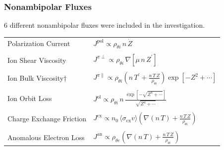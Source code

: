\documentclass[10pt]{beamer}
\begin{document}
\begin{frame} %
\frametitle{Nonambipolar Fluxes}
6 different nonambipolar fluxes were included in the investigation.
\parencite{stringer_explanation_1993} \parencite{itoh_role_1996} \parencite{toda_theoretical_1997} \parencite{staps_backstepping_2017} \\
\begin{center}
\begin{tabular}{l|l} \hline
	Polarization Current & $J^\text{pol} \propto \rho_{\theta i}\, n \, \dot{Z}$ \\ \\
	Ion Shear Viscosity & $J^{\pi\perp} \propto \rho_{\theta i} \,
		\nabla\left[\mu \, n \, Z^\prime\right]$ \\ \\
	Ion Bulk Viscosity$\dagger$ & $J^{\pi\parallel} \propto \rho_{\theta i}
		\left(n\,T^\prime + \frac{n\,T\,Z}{\rho_{\theta i}}\right)
		\exp\left[-Z^2 + \dotsb\right]$ \\ \\
	Ion Orbit Loss & $J^\text{ol} \propto \rho_{\theta i} \, n \,
		\frac{\exp\left[-\sqrt{Z^4 + \dotsb}\right]}{\sqrt{Z^4 + \dotsb}}$ \\ \\
	Charge Exchange Friction & $J^\text{cx} \propto n_0 \,
		\langle \sigma_\text{cx} v\rangle \left(\nabla (n\,T) +
		\frac{n\,T\,Z}{\rho_{\theta i}}\right)$ \\ \\
	Anomalous Electron Loss & $J^\text{an} \propto \rho_{\theta e}
		\left(\nabla (n\,T) + \frac{n\,T\,Z}{\rho_{\theta i}}\right)$

\end{tabular}
\end{center}
\end{frame}
\end{document}
